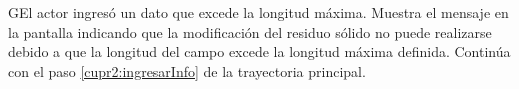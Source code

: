            \begin{UCtrayectoriaA}{G}{El actor ingresó un dato que excede la longitud máxima.}    
    \UCpaso[\UCsist] Muestra el mensaje  en la pantalla  indicando que la modificación del residuo sólido no puede realizarse debido a que la longitud del campo excede la longitud máxima definida.
    \UCpaso[] Continúa con el paso \ref{cupr2:ingresarInfo} de la trayectoria principal.     
    \end{UCtrayectoriaA}
